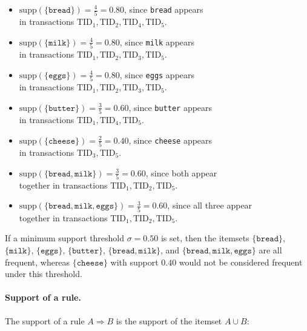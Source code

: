 \begin{itemize}
  \item $\mathrm{supp}(\{\texttt{bread}\}) = \frac{4}{5} = 0.80$, since \texttt{bread} appears \\ 
  in transactions $\text{TID}_1, \text{TID}_2, \text{TID}_4, \text{TID}_5$.
  \item $\mathrm{supp}(\{\texttt{milk}\}) = \frac{4}{5} = 0.80$, since \texttt{milk} appears\\
  in transactions $\text{TID}_1, \text{TID}_2, \text{TID}_3, \text{TID}_5$.
  \item $\mathrm{supp}(\{\texttt{eggs}\}) = \frac{4}{5} = 0.80$, since \texttt{eggs} appears\\
  in transactions $\text{TID}_1, \text{TID}_2, \text{TID}_3, \text{TID}_5$.
  \item $\mathrm{supp}(\{\texttt{butter}\}) = \frac{3}{5} = 0.60$, since \texttt{butter} appears\\
  in transactions $\text{TID}_1, \text{TID}_4, \text{TID}_5$.
  \item $\mathrm{supp}(\{\texttt{cheese}\}) = \frac{2}{5} = 0.40$, since \texttt{cheese} appears\\
  in transactions $\text{TID}_3, \text{TID}_5$.
  \item $\mathrm{supp}(\{\texttt{bread}, \texttt{milk}\}) = \frac{3}{5} = 0.60$, since both appear \\
  together in transactions $\text{TID}_1, \text{TID}_2, \text{TID}_5$.
  \item $\mathrm{supp}(\{\texttt{bread}, \texttt{milk}, \texttt{eggs}\}) = \frac{3}{5} = 0.60$, since all three appear\\
  together in transactions $\text{TID}_1, \text{TID}_2, \text{TID}_5$.
\end{itemize}

If a minimum support threshold $\sigma = 0.50$ is set, then the itemsets $\{\texttt{bread}\}$, $\{\texttt{milk}\}$, $\{\texttt{eggs}\}$, $\{\texttt{butter}\}$, $\{\texttt{bread}, \texttt{milk}\}$, and $\{\texttt{bread}, \texttt{milk}, \texttt{eggs}\}$ are all frequent, whereas $\{\texttt{cheese}\}$ with support $0.40$ would not be considered frequent under this threshold.

\paragraph{Support of a rule.} The support of a rule $A \Rightarrow B$ is the support of the itemset $A \cup B$:


